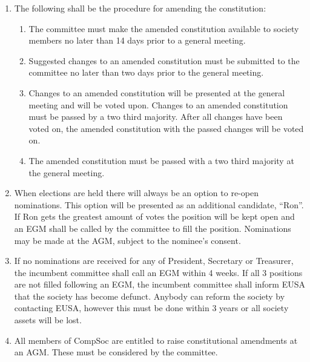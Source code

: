 \begin{enumerate}
\item The following shall be the procedure for amending the constitution:
  \begin{enumerate}
  \item The committee must make the amended constitution available to society members no later than 14 days prior to a general meeting.
  \item Suggested changes to an amended constitution must be submitted to the committee no later than two days prior to the general meeting.
  \item Changes to an amended constitution will be presented at the general meeting and will be voted upon. Changes to an amended constitution must be passed by a two third majority. After all changes have been voted on, the amended constitution with the passed changes will be voted on.
  \item The amended constitution must be passed with a two third majority at the general meeting.
  \end{enumerate}

\item When elections are held there will always be an option to re-open nominations. This option will be presented as an additional candidate, \enquote{Ron}. If Ron gets the greatest amount of votes the position will be kept open and an EGM shall be called by the committee to fill the position. Nominations may be made at the AGM, subject to the nominee's consent.

\item If no nominations are received for any of President, Secretary or Treasurer, the incumbent committee shall call an EGM within 4 weeks. If all 3 positions are not filled following an EGM, the incumbent committee shall inform EUSA that the society has become defunct. Anybody can reform the society by contacting EUSA, however this must be done within 3 years or all society assets will be lost.

\item All members of CompSoc are entitled to raise constitutional amendments at an AGM. These must be considered by the committee.

\end{enumerate}
